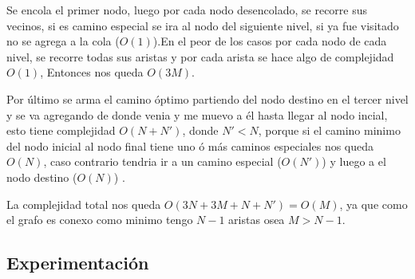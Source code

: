     Se encola el primer nodo, luego por cada nodo desencolado, se recorre sus vecinos, si es camino especial se ira al nodo del siguiente nivel, si ya fue visitado no se agrega a la cola ($O(1)$).En el peor de los casos por cada nodo de cada nivel, se recorre todas sus aristas y por cada arista se hace algo de complejidad $O(1)$, Entonces nos queda $O(3M)$.

    Por último se arma el camino óptimo partiendo del nodo destino en el tercer nivel y se va agregando de donde venia y me muevo a él hasta llegar al nodo incial, esto tiene complejidad $O(N + N')$, donde $N' < N$, porque si el camino minimo del nodo inicial al nodo final tiene uno ó más caminos especiales nos queda $O(N)$, caso contrario tendria ir a un camino especial ($O(N')$) y luego a el nodo destino ($O(N)$) .

    La complejidad total nos queda $O(3N + 3M + N + N') = O(M)$, ya que como el grafo es conexo como minimo tengo $N-1$ aristas osea $M > N-1$.

    \subsection{Experimentación}

